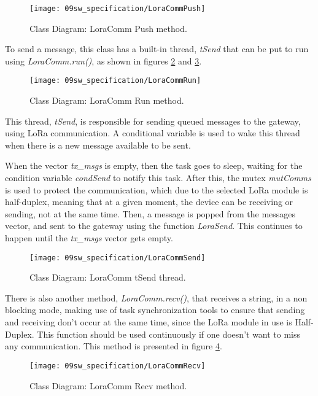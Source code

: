 \begin{figure}[H]
	\centering
	\texttt{[image: 09sw\_specification/LoraCommPush]}
	\caption{Class Diagram: LoraComm Push method.}
	\label{fig:LoraCommPush}
\end{figure}

To send a message, this class has a built-in thread, \textit{tSend} that can be put to run using \textit{LoraComm.run()}, as shown in figures \ref{fig:LoraCommRun} and \ref{fig:LoraCommSend}.

\begin{figure}[H]
	\centering
	\texttt{[image: 09sw\_specification/LoraCommRun]}
	\caption{Class Diagram: LoraComm Run method.}
	\label{fig:LoraCommRun}
\end{figure}

This thread, \textit{tSend}, is responsible for sending queued messages to the gateway, using LoRa communication. A conditional variable is used to wake this thread when there is a new message available to be sent.

When the vector \textit{tx\_msgs} is empty, then the task goes to sleep, waiting for the condition variable \textit{condSend} to notify this task. After this, the mutex \textit{mutComms} is used to protect the communication, which due to the selected LoRa module is half-duplex, meaning that at a given moment, the device can be receiving or sending, not at the same time. Then, a message is popped from the messages vector, and sent to the gateway using the function \textit{LoraSend}. This continues to happen until the \textit{tx\_msgs} vector gets empty.

\begin{figure}[H]
	\centering
	\texttt{[image: 09sw\_specification/LoraCommSend]}
	\caption{Class Diagram: LoraComm tSend thread.}
	\label{fig:LoraCommSend}
\end{figure}

There is also another method, \textit{LoraComm.recv()}, that receives a string, in a non blocking mode, making use of task synchronization tools to ensure that sending and receiving don't occur at the same time, since the LoRa module in use is Half-Duplex. This function should be used continuously if one doesn't want to miss any communication. This method is presented in figure \ref{fig:LoraCommRecv}.

\begin{figure}[H]
	\centering
	\texttt{[image: 09sw\_specification/LoraCommRecv]}
	\caption{Class Diagram: LoraComm Recv method.}
	\label{fig:LoraCommRecv}
\end{figure}

